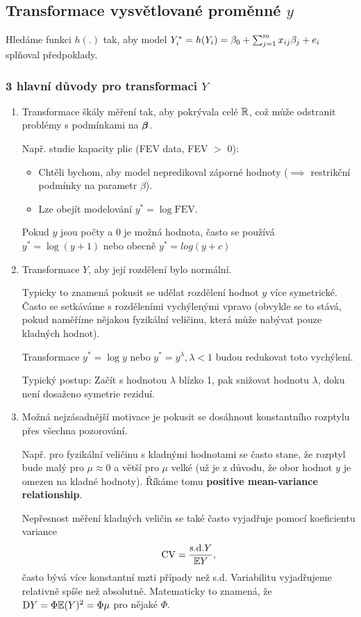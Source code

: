 \subsection{Transformace vysvětlované proměnné $y$}

Hledáme funkci $h(.)$ tak, aby model $Y_i^* = h(Y_i) = \beta_0 + \sum_{j=1}^{m} x_{ij} \beta_j + e_i$ splňoval předpoklady.

\subsubsection*{3 hlavní důvody pro transformaci $Y$}
\begin{enumerate}
	\item Transformace škály měření tak, aby pokrývala celé $\mathbb{R}$, což může odstranit problémy s podmínkami na $\boldsymbol{\beta}$.
	
	Např. studie kapacity plic (FEV data, FEV $>$ 0):
	\begin{itemize}
		\item Chtěli bychom, aby model nepredikoval záporné hodnoty ($\implies$ restrikční podmínky na parametr $\beta$).
		\item Lze obejít modelování $y^* = \log \mathrm{FEV}$.
	\end{itemize}

	Pokud $y$ jsou počty a 0 je možná hodnota, často se používá $y^* = \log (y+1)$ nebo obecně $y^* = log(y + c)$
	
	\item Transformace $Y$, aby její rozdělení bylo  normální.
	
	Typicky to znamená pokusit se udělat rozdělení hodnot $y$ více symetrické. Často se setkáváme s rozděleními vychýlenými vpravo (obvykle se to stává, pokud naměříme nějakou fyzikální veličinu, která může nabývat pouze kladných hodnot).
	
	Transformace $y^* = \log y$ nebo $y^* = y^{\lambda}, \lambda < 1$ budou redukovat toto vychýlení.
	
	Typický postup: Začít s hodnotou $\lambda$ blízko 1, pak snižovat hodnotu $\lambda$, doku není dosaženo  symetrie reziduí.
	
	\item Možná nejzásadnější motivace je pokusit se dosáhnout konstantního rozptylu přes všechna pozorování.
	
	Např. pro fyzikální veličinu s kladnými hodnotami se často stane, že rozptyl bude malý pro $\mu \approx 0$ a větší pro $\mu$ velké (už je z důvodu, že obor hodnot $y$ je omezen na kladné hodnoty). Říkáme tomu \textbf{positive mean-variance relationship}.
	
	Nepřesnost měření kladných veličin se také často vyjadřuje pomocí koeficientu variance
	$$
	\mathrm{CV} = \frac{\mathrm{s.d.} Y}{\mathbb{E} Y},
	$$
	často bývá více konstantní mzti případy než s.d. Variabilitu vyjadřujeme relativně spíše než absolutně. Matematicky to znamená, že $\mathrm{D} Y = \Phi \mathbb{E} (Y)^2 = \Phi \mu$ pro nějaké $\Phi$.
\end{enumerate}